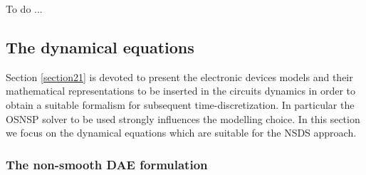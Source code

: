 \begin{ndrva}
  To do ...
\end{ndrva}

\subsection{The dynamical equations}
\label{section23}


Section \ref{section21} is devoted to present the electronic devices models and their mathematical representations to be inserted in the circuits dynamics in order to obtain a suitable formalism for subsequent time-discretization. In particular the OSNSP solver to be used strongly influences the modelling choice. In this section we focus on the dynamical equations which are suitable for the NSDS approach. 



\subsubsection{The non-smooth DAE formulation}

